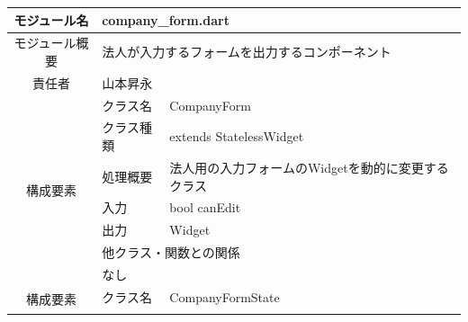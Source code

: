 \begin{table}[H]
  \centering
  \begin{tabular}{|c|l|l|} \hline
    モジュール名                & \multicolumn{2}{l|}{company\_form.dart}                                                                                                     \\ \hline
    モジュール概要               & \multicolumn{2}{p{12cm}|}{法人が入力するフォームを出力するコンポーネント}                                                                                          \\ \hline
    責任者                   & \multicolumn{2}{l|}{山本昇永}                                                                                                                   \\ \hline
    \multirow{7}{*}{構成要素} & クラス名                                                                              & CompanyForm                                             \\ \cline{2-3}
                          & クラス種類                                                                             & extends StatelessWidget                                 \\ \cline{2-3}
                          & 処理概要                                                                              & \multicolumn{1}{p{12cm}|}{法人用の入力フォームのWidgetを動的に変更するクラス} \\ \cline{2-3}
                          & 入力                                                                                & bool canEdit                                            \\ \cline{2-3}
                          & 出力                                                                                & Widget                                                  \\ \cline{2-3}
                          & \multicolumn{2}{l|}{他クラス・関数との関係}                                                                                                            \\ \cline{2-3}
                          & \multicolumn{2}{p{14cm}|}{なし}                                                                                                               \\ \hline
    \multirow{7}{*}{構成要素} & クラス名                                                                              & CompanyFormState                                        \\ \cline{2-3}

\end{tabular}
\end{table}
